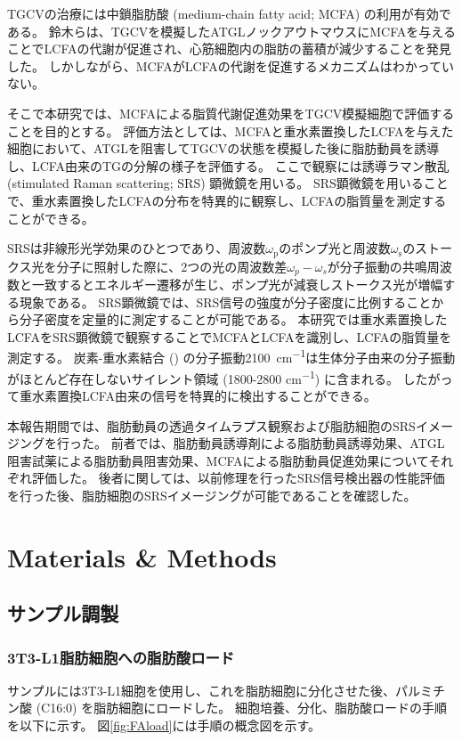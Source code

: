 \documentclass[uplatex,a4paper]{jsarticle}
\begin{document}
TGCVの治療には中鎖脂肪酸 (medium-chain fatty acid; MCFA) の利用が有効である。
鈴木らは、TGCVを模擬したATGLノックアウトマウスにMCFAを与えることでLCFAの代謝が促進され、心筋細胞内の脂肪の蓄積が減少することを発見した\cite{Suzuki2018}。
しかしながら、MCFAがLCFAの代謝を促進するメカニズムはわかっていない。

そこで本研究では、MCFAによる脂質代謝促進効果をTGCV模擬細胞で評価することを目的とする。
評価方法としては、MCFAと重水素置換したLCFAを与えた細胞において、ATGLを阻害してTGCVの状態を模擬した後に脂肪動員を誘導し、LCFA由来のTGの分解の様子を評価する。
ここで観察には誘導ラマン散乱 (stimulated Raman scattering; SRS) 顕微鏡を用いる。
SRS顕微鏡を用いることで、重水素置換したLCFAの分布を特異的に観察し、LCFAの脂質量を測定することができる。

SRSは非線形光学効果のひとつであり、周波数$\omega_{\mathrm{p}}$のポンプ光と周波数$\omega_{\mathrm{s}}$のストークス光を分子に照射した際に、2つの光の周波数差$\omega_p-\omega_s$が分子振動の共鳴周波数と一致するとエネルギー遷移が生じ、ポンプ光が減衰しストークス光が増幅する現象である。
SRS顕微鏡では、SRS信号の強度が分子密度に比例することから分子密度を定量的に測定することが可能である。
本研究では重水素置換したLCFAをSRS顕微鏡で観察することでMCFAとLCFAを識別し、LCFAの脂質量を測定する。
炭素-重水素結合 () の分子振動\SI{2100}{\cm^{-1}}は生体分子由来の分子振動がほとんど存在しないサイレント領域 (1800-2800 \si{\cm^{-1}}) に含まれる。
したがって重水素置換LCFA由来の信号を特異的に検出することができる。

本報告期間では、脂肪動員の透過タイムラプス観察および脂肪細胞のSRSイメージングを行った。
前者では、脂肪動員誘導剤による脂肪動員誘導効果、ATGL阻害試薬による脂肪動員阻害効果、MCFAによる脂肪動員促進効果についてそれぞれ評価した。
後者に関しては、以前修理を行ったSRS信号検出器の性能評価を行った後、脂肪細胞のSRSイメージングが可能であることを確認した。

\section{Materials \& Methods}

\subsection{サンプル調製}
\subsubsection{3T3-L1脂肪細胞への脂肪酸ロード}
サンプルには3T3-L1細胞を使用し、これを脂肪細胞に分化させた後、パルミチン酸 (C16:0) を脂肪細胞にロードした。
細胞培養、分化、脂肪酸ロードの手順を以下に示す。
図\ref{fig:FAload}には手順の概念図を示す。
\end{document}

